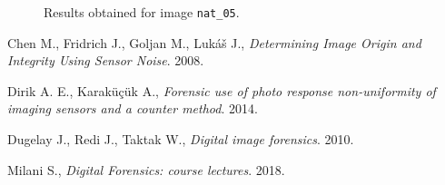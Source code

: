 \documentclass[a4paper, 11pt]{article}
\begin{document}
\begin{figure}[H]
	\centering
	\caption{Results obtained for image \texttt{nat\_05}.}
	\label{fig:differentquality}
\end{figure}

\begin{thebibliography}{3}
	Chen M., Fridrich J., Goljan M., Lukáš J.,
	\textit{Determining Image Origin and Integrity Using Sensor Noise}.
	2008.
	
	Dirik A. E., Karaküçük A.,
	\textit{Forensic use of photo response non-uniformity of imaging sensors and a counter method}.
	2014.
		
	Dugelay J., Redi J., Taktak W.,
	\textit{Digital image forensics}.
	2010.
	
	Milani S.,
	\textit{Digital Forensics: course lectures}.
	2018.
\end{thebibliography}
\end{document}
